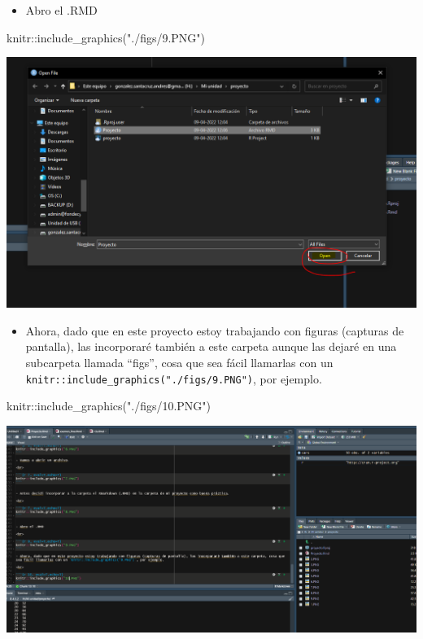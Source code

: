 \documentclass[
]{article}
\newenvironment{Shaded}{}{}
\newcommand{\FunctionTok}[1]{\textcolor[rgb]{0.02,0.16,0.49}{#1}}
\newcommand{\NormalTok}[1]{#1}
\newcommand{\SpecialCharTok}[1]{\textcolor[rgb]{0.25,0.44,0.63}{#1}}
\newcommand{\StringTok}[1]{\textcolor[rgb]{0.25,0.44,0.63}{#1}}
\providecommand{\tightlist}{%
  \setlength{\itemsep}{0pt}\setlength{\parskip}{0pt}}
\begin{document}
\begin{itemize}
\tightlist
\item
  Abro el .RMD
\end{itemize}

\begin{Shaded}
\begin{Highlighting}[]
\NormalTok{knitr}\SpecialCharTok{::}\FunctionTok{include\_graphics}\NormalTok{(}\StringTok{"./figs/9.PNG"}\NormalTok{)}
\end{Highlighting}
\end{Shaded}

\begin{center}\includegraphics[width=0.6\linewidth]{./figs/9} \end{center}

\begin{itemize}
\tightlist
\item
  Ahora, dado que en este proyecto estoy trabajando con figuras
  (capturas de pantalla), las incorporaré también a este carpeta aunque
  las dejaré en una subcarpeta llamada ``figs'', cosa que sea fácil
  llamarlas con un \texttt{knitr::include\_graphics("./figs/9.PNG")},
  por ejemplo.
\end{itemize}

\begin{Shaded}
\begin{Highlighting}[]
\NormalTok{knitr}\SpecialCharTok{::}\FunctionTok{include\_graphics}\NormalTok{(}\StringTok{"./figs/10.PNG"}\NormalTok{)}
\end{Highlighting}
\end{Shaded}

\begin{center}\includegraphics[width=0.6\linewidth]{./figs/10} \end{center}
\end{document}
